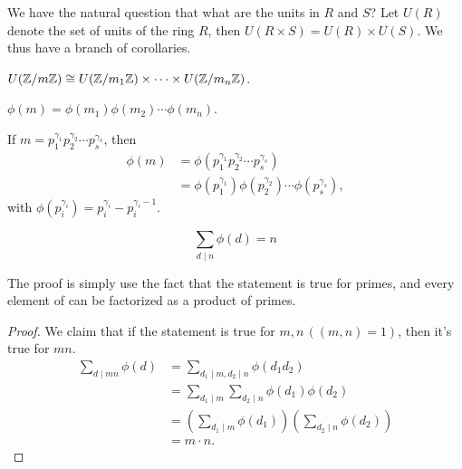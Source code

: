 We have the natural question that what are the units in $R$ and $S$? Let $U(R)$ denote the set of units of the ring $R$, then $U(R\times S) = U(R)\times U(S)$.
We thus have a branch of corollaries.
\begin{corollary}
$U(\mathbb{Z}/m\mathbb{Z}) \cong U(\mathbb{Z}/m_1\mathbb{Z})\times \cdots\times U(\mathbb{Z}/m_n\mathbb{Z})$.
\end{corollary}
\begin{corollary}
$\phi(m) = \phi(m_1)\phi(m_2)\cdots\phi(m_n)$.
\end{corollary}
\begin{corollary}
If $m = p_1^{\gamma_1}p_2^{\gamma_2}\cdots p_s^{\gamma_s}$, then 
\begin{align*}
\phi(m) &= \phi(p_1^{\gamma_1}p_2^{\gamma_2}\cdots p_s^{\gamma_s})\\
&=\phi(p_1^{\gamma_1})\phi(p_2^{\gamma_2})\cdots\phi(p_s^{\gamma_s}), 
\end{align*}
with $\phi(p_i^{\gamma_i}) = p_i^{\gamma_i} -p_i^{\gamma_i-1}$.
\end{corollary}
\begin{corollary}
$$\sum_{d\mid n}\phi(d) = n$$
\end{corollary}
The proof is simply use the fact that the statement is true for primes, and every element of \Z can be factorized as a product of primes.
\begin{proof}
We claim that if the statement is true for $m,n\,((m,n) = 1)$, then it's true for $mn$.
\begin{align*}
\sum_{d\mid mn} \phi(d) &=\sum_{d_1\mid m,d_2\mid n} \phi(d_1d_2)\\
&= \sum_{d_1\mid m}\sum_{d_2\mid n} \phi(d_1)\phi(d_2)\\&=(\sum_{d_1\mid m}\phi(d_1))(\sum_{d_2\mid n}\phi(d_2))\\
&= m\cdot n.
\end{align*}
\end{proof}
